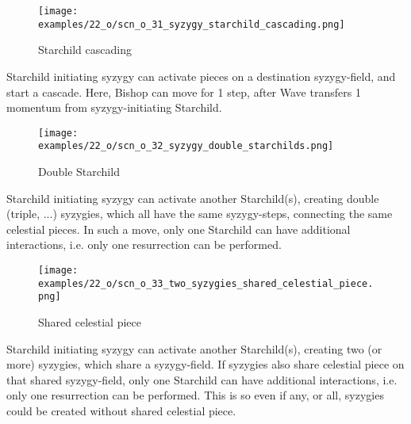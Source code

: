 \vspace*{-1.2\baselineskip}
\noindent
\begin{figure}[!h]
\texttt{[image: examples/22\_o/scn\_o\_31\_syzygy\_starchild\_cascading.png]}
\caption{Starchild cascading}
\label{fig:scn_o_31_syzygy_starchild_cascading}
\end{figure}

Starchild initiating syzygy can activate pieces on a destination syzygy-field, and start a cascade.
Here, Bishop can move for 1 step, after Wave transfers 1 momentum from syzygy-initiating Starchild.

\clearpage %

\vspace*{-2.1\baselineskip}
\noindent
\begin{figure}[!h]
\texttt{[image: examples/22\_o/scn\_o\_32\_syzygy\_double\_starchilds.png]}
\caption{Double Starchild}
\label{fig:scn_o_32_syzygy_double_starchilds}
\end{figure}

Starchild initiating syzygy can activate another Starchild(s), creating double (triple, ...) syzygies,
which all have the same syzygy-steps, connecting the same celestial pieces. In such a move, only one
Starchild can have additional interactions, i.e. only one resurrection can be performed.

\clearpage %

\vspace*{-2.1\baselineskip}
\noindent
\begin{figure}[!h]
\texttt{[image: examples/22\_o/scn\_o\_33\_two\_syzygies\_shared\_celestial\_piece.png]}
\caption{Shared celestial piece}
\label{fig:scn_o_33_two_syzygies_shared_celestial_piece}
\end{figure}

Starchild initiating syzygy can activate another Starchild(s), creating two (or more) syzygies, which
share a syzygy-field. If syzygies also share celestial piece on that shared syzygy-field, only one
Starchild can have additional interactions, i.e. only one resurrection can be performed. This is so
even if any, or all, syzygies could be created without shared celestial piece.

